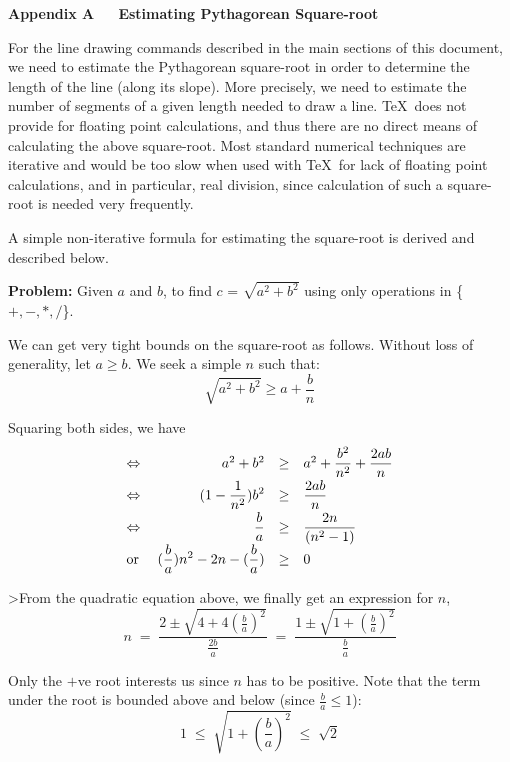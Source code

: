 \appendix
\medskip\noindent
{\Large\bf Appendix A\ \ \ Estimating Pythagorean Square-root}

\medskip\noindent
For the line drawing commands described in the main sections of this
document, we need to estimate the Pythagorean square-root in order to
determine the length of the line (along its slope). More precisely, we need
to estimate the number of segments of a given length needed to draw a line.
\TeX\ does not provide for floating point calculations, and thus there are no
direct means of calculating the above square-root. Most standard numerical
techniques are iterative and would be too slow when used with \TeX\ for lack
of floating point calculations, and in particular, real division, since
calculation of such a square-root is needed very frequently.

A simple non-iterative formula for estimating the square-root is derived and
described below.

\bigskip\noindent
{\bf Problem: } Given $a$ and $b$, to find $c$ = $\sqrt{a^2 + b^2}$ using
only operations in \{$+,-,*,/$\}.

We can get very tight bounds on the square-root as follows.
Without loss of generality, let $a \ge b$. We seek a simple $n$
such that:
\[\sqrt{a^2 + b^2} \ge a + \frac{b}{n}\]

Squaring both sides, we have
\[\begin{array}{lrcl}
\Leftrightarrow & a^2+b^2 &\ge& a^2 + \displaystyle\frac{b^2}{n^2} +
\displaystyle\frac{2ab}{n} \\[2mm]
\Leftrightarrow & (1 - \displaystyle\frac{1}{n^2}) b^2 &\ge&
\displaystyle\frac{2ab}{n}\\[2mm]
\Leftrightarrow & \displaystyle\frac{b}{a} &\ge& \displaystyle\frac{2n}{(n^2
-1)}\\[2mm]
\mbox{or }      & (\displaystyle\frac{b}{a})n^2 - 2n -(\displaystyle
\frac{b}{a}) &\ge& 0
\end{array}\hfill\]

>From the quadratic equation above, we finally get an expression for $n$,
\[ n \;=\; \frac{2 \pm \sqrt{4 + 4(\frac{b}{a})^2}}{\frac{2b}{a}}
      \;=\; \frac{1 \pm \sqrt{1 + (\frac{b}{a})^2}}{\frac{b}{a}} \]

Only the $+$ve root interests us since $n$ has to be positive.
Note that the term under the root is  bounded above and below (since
$\frac{b}{a} \le 1$):
\[1 \;\le\; \sqrt{1 + (\frac{b}{a})^2} \;\le\; \sqrt{2}\]


